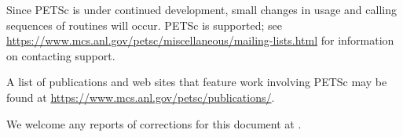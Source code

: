 Since PETSc is under continued development, small changes in usage and
calling sequences of routines will occur.  PETSc is supported; see
\href{https://www.mcs.anl.gov/petsc/miscellaneous/mailing-lists.html}{https://www.mcs.anl.gov/petsc/miscellaneous/mailing-lists.html}
for information on contacting support.

A list of publications and web sites that feature work involving PETSc may be found at
\href{https://www.mcs.anl.gov/petsc/publications/}{https://www.mcs.anl.gov/petsc/publications/}.

We welcome any reports of corrections for this document at .

\medskip \medskip



